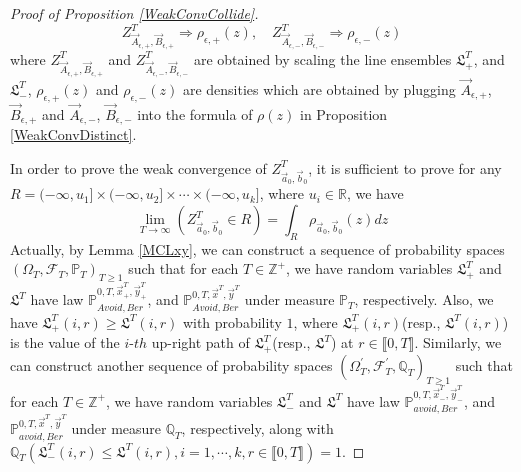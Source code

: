 \begin{proof}[Proof of Proposition \ref{WeakConvCollide}]
$$Z^{T}_{\vec{A}_{\epsilon,+}, \vec{B}_{\epsilon, +}}\Rightarrow \rho_{\epsilon,+}(z),\quad Z^{T}_{\vec{A}_{\epsilon,-}, \vec{B}_{\epsilon, -}}\Rightarrow \rho_{\epsilon,-}(z)$$
where $Z^{T}_{\vec{A}_{\epsilon,+},\vec{B}_{\epsilon,+}}$ and $Z^{T}_{\vec{A}_{\epsilon,-},\vec{B}_{\epsilon,-}}$ are obtained by scaling the line ensembles $\mathfrak{L}_{+}^{T}$, and $\mathfrak{L}_{-}^{T}$, $\rho_{\epsilon,+}(z)$ and $\rho_{\epsilon,-}(z)$ are densities which are obtained by plugging $\vec{A}_{\epsilon,+}$, $\vec{B}_{\epsilon,+}$ and $\vec{A}_{\epsilon,-}$, $\vec{B}_{\epsilon,-}$ into the formula of $\rho(z)$ in Proposition \ref{WeakConvDistinct}.

In order to prove the weak convergence of $Z^{T}_{\vec{a}_{0},\vec{b}_{0}}$, it is sufficient to prove for any $R=(-\infty,u_{1}]\times(-\infty,u_{2}]\times\cdots\times(-\infty,u_{k}]$, where $u_{i}\in\mathbb{R}$, we have $$\lim_{T\rightarrow\infty}(Z^{T}_{\vec{a}_{0},\vec{b}_{0}}\in R)=\int_{R}\rho_{\vec{a}_{0},\vec{b}_{0}}(z)dz$$
Actually, by Lemma \ref{MCLxy}, we can construct a sequence of probability spaces $(\Omega_{T},\mathcal{F}_{T},\mathbb{P}_{T})_{T\geqslant 1}$ such that for each $T\in\mathbb{Z}^{+}$, we have random variables $\mathfrak{L}_{+}^{T}$ and $\mathfrak{L}^{T}$ have law $\mathbb{P}_{Avoid,Ber}^{0,T,\vec{x}^{T}_{+},\vec{y}^{T}_{+}}$, and $\mathbb{P}_{Avoid,Ber}^{0,T,\vec{x}^{T},\vec{y}^{T}}$ under measure $\mathbb{P}_{T}$, respectively. Also, we have $\mathfrak{L}_{+}^{T}(i,r)\geqslant \mathfrak{L}^{T}(i,r)$ with probability $1$, where $\mathfrak{L}_{+}^{T}(i,r)$(resp., $\mathfrak{L}^{T}(i,r)$) is the value of the $i$-$th$ up-right path of $\mathfrak{L}_{+}^{T}$(resp., $\mathfrak{L}^{T}$) at $r\in\llbracket 0,T\rrbracket$. Similarly, we can construct another sequence of probability spaces $(\Omega_{T}^{\prime},\mathcal{F}_{T}^{\prime},\mathbb{Q}_{T})_{T\geqslant 1}$ such that for each $T\in\mathbb{Z}^{+}$, we have random variables $\mathfrak{L}_{-}^{T}$ and $\mathfrak{L}^{T}$ have law $\mathbb{P}_{avoid,Ber}^{0,T,\vec{x}^{T}_{-},\vec{y}^{T}_{-}}$, and $\mathbb{P}_{avoid,Ber}^{0,T,\vec{x}^{T},\vec{y}^{T}}$ under measure $\mathbb{Q}_{T}$, respectively, along with $\mathbb{Q}_{T}(\mathfrak{L}_{-}^{T}(i,r)\leqslant \mathfrak{L}^{T}(i,r), i=1,\cdots, k, r\in\llbracket 0,T\rrbracket)=1$.


\end{proof}
